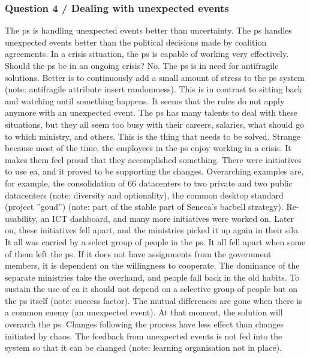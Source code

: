 \subsubsection{Question 4 / Dealing with unexpected events}
The \gls{ps} is handling unexpected events better than uncertainty. The \gls{ps} handles unexpected events better than the political decisions made by coalition agreements. In a crisis situation, the \gls{ps} is capable of working very effectively. Should the \gls{ps} be in an ongoing crisis? No. The \gls{ps} is in need for \gls{antifragile} solutions. Better is to continuously add a small amount of stress to the \gls{ps} system (note: antifragile attribute insert randomness). This is in contrast to sitting back and watching until something happens. It seems that the rules do not apply anymore with an unexpected event. The \gls{ps} has many talents to deal with these situations, but they all seem too busy with their careers, salaries, what should go to which ministry, and others. This is the thing that needs to be solved. Strange because most of the time, the employees in the \gls{ps} enjoy working in a crisis. It makes them feel proud that they accomplished something. There were initiatives to use \gls{ea}, and it proved to be supporting the changes. Overarching examples are, for example, the consolidation of 66 datacenters to two private and two public datacenters (note: diversity and optionality), the common desktop standard (project ''goud'') (note: part of the stable part of Seneca's barbell strategy). Re-usability, an ICT dashboard, and many more initiatives were worked on. Later on, these initiatives fell apart, and the ministries picked it up again in their silo. It all was carried by a select group of people in the \gls{ps}. It all fell apart when some of them left the \gls{ps}. If it does not have assignments from the government members, it is dependent on the willingness to cooperate. The dominance of the separate ministries take the overhand, and people fall back in the old habits. To sustain the use of \gls{ea} it should not depend on a selective group of people but on the \gls{ps} itself (note: success factor). The mutual differences are gone when there is a common enemy (an unexpected event). At that moment, the solution will overarch the \gls{ps}. Changes following the process have less effect than changes initiated by chaos. The feedback from unexpected events is not fed into the system so that it can be changed (note: learning organisation not in place).
